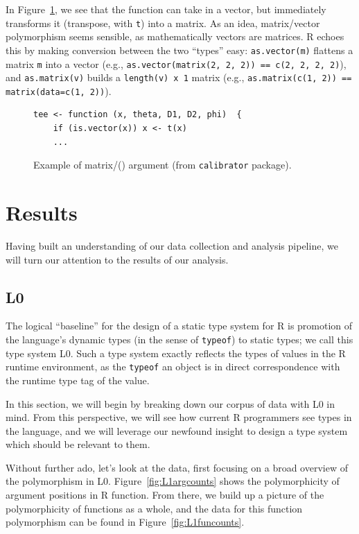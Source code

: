 \documentclass[acmsmall,10pt,review,anonymous]{acmart}\settopmatter{printfolios=true,printccs=false,printacmref=false}
\newcommand{\code}[1]{\lstinline|#1|\xspace}
\begin{document}
In Figure~\ref{fig:matvec}, we see that the function can take in a vector,
but immediately transforms it (transpose, with {\tt t}) into a matrix.  As
an idea, matrix/vector polymorphism seems sensible, as mathematically
vectors are matrices.  R echoes this by making conversion between the two
``types'' easy: \code{as.vector(m)} flattens a matrix \code{m} into a vector
(e.g., \code{as.vector(matrix(2, 2, 2)) == c(2, 2, 2, 2)}), and
\code{as.matrix(v)} builds a {\tt length(v) x 1} matrix (e.g.,
\code{as.matrix(c(1, 2)) == matrix(data=c(1, 2))}).  

\begin{figure}[!hb]{\small\begin{lstlisting}[style=R]
tee <- function (x, theta, D1, D2, phi)  {
    if (is.vector(x)) x <- t(x)
    ...
\end{lstlisting}}\caption{Example of matrix/(\D) argument (from {\tt calibrator} package).}\label{fig:matvec}\end{figure}

%
%
%
\section{Results}\label{sec:results}

Having built an understanding of our data collection and analysis pipeline, we will turn our attention to the results of our analysis.  


%
%
%
%
\subsection{L0}

The logical ``baseline'' for the design of a static type system for R is
promotion of the language's dynamic types (in the sense of \code{typeof}) to
static types; we call this type system L0.  Such a type system exactly
reflects the types of values in the R runtime environment, as the
\code{typeof} an object is in direct correspondence with the runtime type
tag of the value.

In this section, we will begin by breaking down our corpus of data with L0
in mind.  From this perspective, we will see how current R programmers see
types in the language, and we will leverage our newfound insight to design a
type system which should be relevant to them.

Without further ado, let's look at the data, first focusing on a broad
overview of the polymorphism in L0.  Figure~\ref{fig:L1argcounts} shows the
polymorphicity of argument positions in R function.  From there, we build up
a picture of the polymorphicity of functions as a whole, and the data for
this function polymorphism can be found in Figure~\ref{fig:L1funcounts}.
\end{document}
